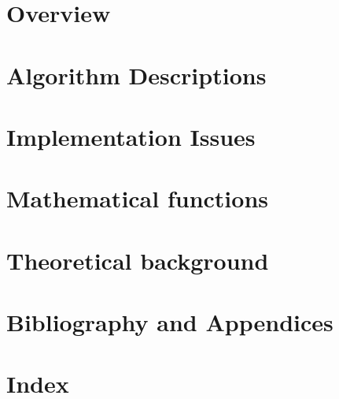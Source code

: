 \begin{center}
\begin{tabular}{lp{10mm}l}
\end{tabular}
\end{center}



%
\newpage
\thispagestyle{empty}
\rule{0pt}{10pt}
\newpage

\tableofcontents

\cleardoublepage
{}
     

%
%
\part{Overview}



%
\part{Algorithm Descriptions}




%




%
%
%
% 
%
\part{Implementation Issues}


%
\part{Mathematical functions}




%
\part{Theoretical background}


%
%
%
%
\part{Bibliography and Appendices}

%
\part{Index}
\printindex






